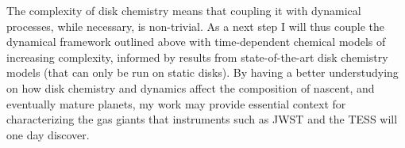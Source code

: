 The complexity of disk chemistry means that coupling it with dynamical processes, while necessary, is non-trivial. As a next step I will thus couple the dynamical framework outlined above with time-dependent chemical models of increasing complexity, informed by results from state-of-the-art disk chemistry models (that can only be run on static disks).  By having a better understudying on how disk chemistry and dynamics affect the composition of nascent, and eventually mature planets, my work may provide essential context for characterizing the gas giants
that instruments such as JWST and the TESS will one day discover.  
 
